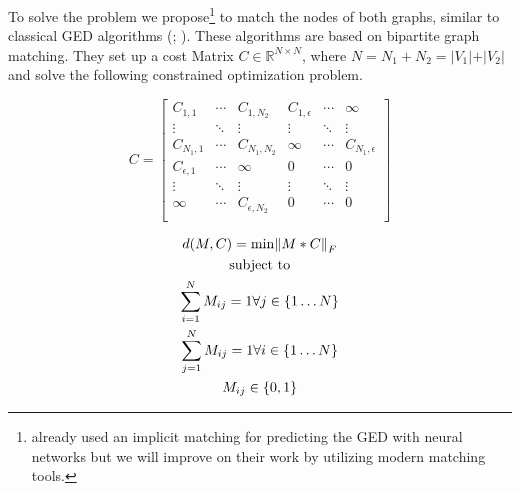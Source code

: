 To solve the problem we propose\footnote{\cite{riba2018} already used an implicit matching for predicting the GED with neural networks but we will improve on their work by utilizing modern matching tools.} to match the nodes of both graphs, similar to classical GED algorithms (\citealp{hungarian2009}; \citealp{frankhauser2011}). These algorithms are based on bipartite graph matching. They set up a cost Matrix $C \in \mathbb{R}^{N \times N}$, where $N = N_1 + N_2 = \vert V_1 \vert + \vert V_2 \vert $ and solve the following constrained optimization problem.

\vspace{.2cm}

\noindent
\begin{minipage}{.5\linewidth}

     \[
          C=
               \left[
               \begin{array}{ccc|ccc}
                    C_{1,1} & \dotsi & C_{1, N_2} & C_{1, \epsilon} & \dotsi & \infty \\
                    \vdots & \ddots & \vdots & \vdots & \ddots & \vdots \\
                    C_{N_1, 1} & \dotsi & C_{N_1, N_2} & \infty & \dotsi & C_{N_1, \epsilon} \\
                    \hline
                    C_{\epsilon, 1} & \dotsi & \infty & 0 & \dotsi & 0 \\
                    \vdots & \ddots & \vdots & \vdots & \ddots & \vdots \\
                    \infty & \dotsi & C_{\epsilon, N_2} & 0 & \dotsi & 0 \\
               \end{array}
               \right]
     \]

\end{minipage}%
\begin{minipage}{.5\linewidth}

     \begin{equation}
          \begin{gathered}
               d(M, C) = \min \norm{M * C}_F \\
               \text{subject to} \\
               \sum_{i = 1}^{N} M_{ij} = 1 \forall j \in \{1 \dots N\} \\
               \sum_{j = 1}^{N} M_{ij} = 1 \forall i \in \{1 \dots N\} \\
               M_{ij} \in \{0, 1\}
          \end{gathered}
     \end{equation}

\end{minipage}


